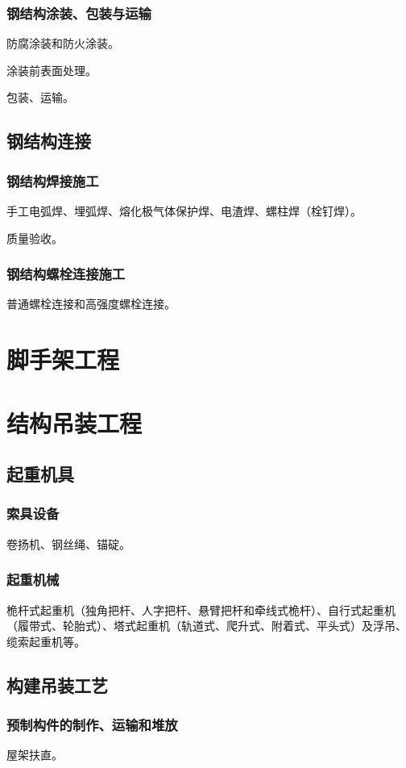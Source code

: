 \documentclass{book}
\begin{document}
\subsection{钢结构涂装、包装与运输}
\par 防腐涂装和防火涂装。
\par 涂装前表面处理。
\par 包装、运输。
\section{钢结构连接}
\subsection{钢结构焊接施工}
\par 手工电弧焊、埋弧焊、熔化极气体保护焊、电渣焊、螺柱焊（栓钉焊）。
\par 质量验收。
\subsection{钢结构螺栓连接施工}
\par 普通螺栓连接和高强度螺栓连接。
\chapter{脚手架工程}
\chapter{结构吊装工程}
\section{起重机具}
\subsection{索具设备}
\par 卷扬机、钢丝绳、锚碇。
\subsection{起重机械}
\par 桅杆式起重机（独角把杆、人字把杆、悬臂把杆和牵线式桅杆）、自行式起重机（履带式、轮胎式）、塔式起重机（轨道式、爬升式、附着式、平头式）及浮吊、缆索起重机等。
\section{构建吊装工艺}
\subsection{预制构件的制作、运输和堆放}
\par 屋架扶直。
\end{document}
